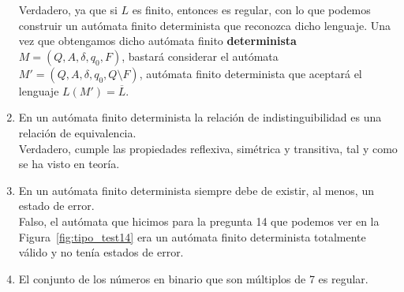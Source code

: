 \begin{enumerate}
        Verdadero, ya que si $L$ es finito, entonces es regular, con lo que podemos construir un autómata finito determinista que reconozca dicho lenguaje. Una vez que obtengamos dicho autómata finito \textbf{determinista} $M=(Q,A,\delta,q_0,F)$, bastará considerar el autómata $M'=(Q,A,\delta,q_0,Q\setminus F)$, autómata finito determinista que aceptará el lenguaje $L(M') = \overline{L}$.
    \item En un autómata finito determinista la relación de indistinguibilidad es una relación de equivalencia.\\

        Verdadero, cumple las propiedades reflexiva, simétrica y transitiva, tal y como se ha visto en teoría.
    \item En un autómata finito determinista siempre debe de existir, al menos, un estado de error.\\

        Falso, el autómata que hicimos para la pregunta 14 que podemos ver en la Figura~\ref{fig:tipo_test14} era un autómata finito determinista totalmente válido y no tenía estados de error.

    \item El conjunto de los números en binario que son múltiplos de 7 es regular.\\


\end{enumerate}
